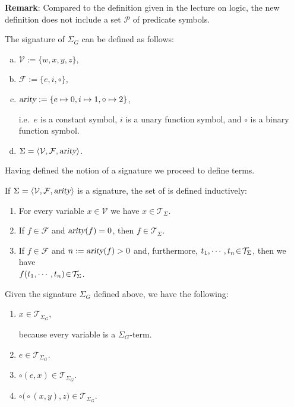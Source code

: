 \noindent
\textbf{Remark}:  Compared to the definition given in the lecture on logic,
the new definition does not include a set $\mathcal{P}$ of predicate symbols.
\vspace*{0.2cm}

\example
The signature of  $\Sigma_G$ can be defined as follows:
\begin{enumerate}[(a)]
\item $\mathcal{V} := \{ w, x, y, z \}$,
\item $\mathcal{F} := \{ e, i, \circ \}$,
\item $\textsl{arity} := \{ e \mapsto 0, i \mapsto 1, \circ \mapsto 2 \}$,
  
      i.e.~$e$ is a constant symbol, $i$ is a unary function symbol, and $\circ$ is a binary function symbol.
\item $\Sigma = \langle \mathcal{V}, \mathcal{F}, \textsl{arity} \rangle$. \eoxs
\end{enumerate}

\noindent
Having defined the notion of a signature we proceed to define terms.

\begin{Definition}
  If $\Sigma = \langle \mathcal{V}, \mathcal{F}, \textsl{arity} \rangle$ is a signature, the set of
     
   is defined inductively:
  \begin{enumerate}
  \item For every variable $x \in \mathcal{V}$ we have $x \in \mathcal{T}_\Sigma$.
  \item If $f \in \mathcal{F}$ and $\textsl{arity}(f) = 0$, then $f \in \mathcal{T}_\Sigma$.
  \item If $f \in \mathcal{F}$ and $n := \textsl{arity}(f) > 0$ and, furthermore, $t_1,\cdots,t_n \!\in\! \mathcal{T}_\Sigma$,  then we have
        \\[0.2cm]
        \hspace*{1.3cm} $f(t_1,\cdots,t_n) \!\in\! \mathcal{T}_\Sigma$.
        \eoxs
  \end{enumerate}
\end{Definition}

\example
Given the signature $\Sigma_G$ defined above, we have the following:
\begin{enumerate}
\item $x \in \mathcal{T}_{\Sigma_G}$,
  
      because every variable is a $\Sigma_{G}$-term.
\item $e \in \mathcal{T}_{\Sigma_G}$.
\item $\circ(e,x) \in \mathcal{T}_{\Sigma_G}$.
\item $\circ\bigl(\circ(x,y),z\bigr) \in \mathcal{T}_{\Sigma_G}$.
\end{enumerate}

